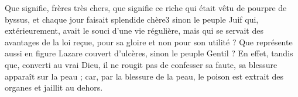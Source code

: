 Que signifie, frères très chers, que signifie ce riche qui était vêtu de pourpre de byssus, et chaque jour faisait splendide chère3 sinon le peuple Juif qui, extérieurement, avait le souci d’une vie régulière, mais qui se servait des avantages de la loi reçue, pour sa gloire et non pour son utilité ? Que représente aussi en figure Lazare couvert d’ulcères, sinon le peuple Gentil ? En effet, tandis que, converti au vrai Dieu, il ne rougit pas de confesser sa faute, sa blessure apparaît sur la peau ; car, par la blessure de la peau, le poison est extrait des organes et jaillit au dehors.
